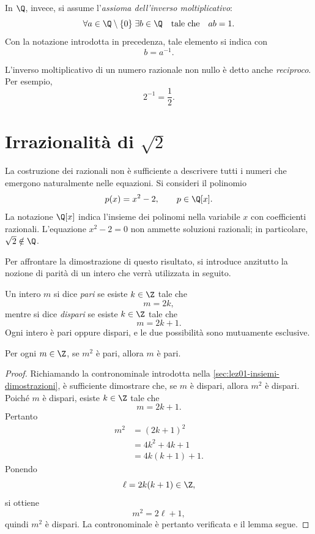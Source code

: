In \(\Q\), invece, si assume l'\emph{assioma dell'inverso moltiplicativo}:
\[
  \forall a\in\Q\setminus\{0\}\;\exists b\in\Q
  \quad\text{tale che}\quad
  ab=1.
\]
Con la notazione introdotta in precedenza, tale elemento si indica con
\[
  b=a^{-1}.
\]

L'inverso moltiplicativo di un numero razionale non nullo è detto anche
\emph{reciproco}. Per esempio,
\[
  2^{-1}=\frac12.
\]

\section[Irrazionalità della radice quadrata di 2]{Irrazionalità di \(\sqrt{2}\)}
\label{sec:lez02-irrazionalita-radice-due}

La costruzione dei razionali non è sufficiente a descrivere tutti i numeri
che emergono naturalmente nelle equazioni. Si consideri il polinomio
\[
  p(x)=x^2-2,
  \qquad p\in\Q[x].
\]
La notazione \(\Q[x]\) indica l'insieme dei polinomi nella variabile \(x\)
con coefficienti razionali. L'equazione \(x^2-2=0\) non ammette soluzioni
razionali; in particolare, \(\sqrt{2}\notin\Q\). 

Per affrontare la dimostrazione di questo risultato, si introduce anzitutto la nozione di parità di un intero che 
verrà utilizzata in seguito.

Un intero \(m\) si dice \emph{pari} se esiste \(k\in\Z\) tale che
\[
  m=2k,
\]
mentre si dice \emph{dispari} se esiste \(k\in\Z\) tale che
\[
  m=2k+1.
\]
Ogni intero è pari oppure dispari, e le due possibilità sono mutuamente
esclusive.

\begin{lemma}
\label{lem:quadrato-pari}
Per ogni \(m\in\Z\), se \(m^2\) è pari, allora \(m\) è pari.
\end{lemma}

\begin{proof}
Richiamando la contronominale introdotta nella
\cref{sec:lez01-insiemi-dimostrazioni}, è sufficiente dimostrare che, se
\(m\) è dispari, allora \(m^2\) è dispari. Poiché \(m\) è dispari, esiste \(k\in\Z\) tale che
\[
  m=2k+1.
\]
Pertanto
\begin{align*}
  m^2
    &=(2k+1)^2\\
    &=4k^2+4k+1\\
    &=4k(k+1)+1.
\end{align*}
Ponendo
\[
  \ell=2k(k+1)\in\Z,
\]
si ottiene
\[
  m^2=2\ell+1,
\]
quindi \(m^2\) è dispari. La contronominale è pertanto verificata e il
lemma segue.
\end{proof}


